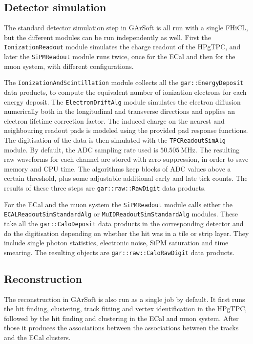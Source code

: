 \subsection{Detector simulation}

The standard detector simulation step in GArSoft is all run with a single FHiCL, but the different modules can be run independently as well. First the \texttt{IonizationReadout} module simulates the charge readout of the HPgTPC, and later the \texttt{SiPMReadout} module runs twice, once for the ECal and then for the muon system, with different configurations.

The \texttt{IonizationAndScintillation} module collects all the \texttt{gar::EnergyDeposit} data products, to compute the equivalent number of ionization electrons for each energy deposit. The \texttt{ElectronDriftAlg} module simulates the electron diffusion numerically both in the longitudinal and transverse directions and applies an electron lifetime correction factor. The induced charge on the nearest and neighbouring readout pads is modeled using the provided pad response functions. The digitisation of the data is then simulated with the \texttt{TPCReadoutSimAlg} module. By default, the ADC sampling rate used is $50.505~\mathrm{MHz}$. The resulting raw waveforms for each channel are stored with zero-suppression, in order to save memory and CPU time. The algorithms keep blocks of ADC values above a certain threshold, plus some adjustable additional early and late tick counts. The results of these three steps are \texttt{gar::raw::RawDigit} data products.

For the ECal and the muon system the \texttt{SiPMReadout} module calls either the \texttt{ECALReadoutSimStandardAlg} or \texttt{MuIDReadoutSimStandardAlg} modules. These take all the \texttt{gar::CaloDeposit} data products in the corresponding detector and do the digitisation depending on whether the hit was in a tile or strip layer. They include single photon statistics, electronic noise, SiPM saturation and time smearing. The resulting objects are \texttt{gar::raw::CaloRawDigit} data products.

\subsection{Reconstruction}

The reconstruction in GArSoft is also run as a single job by default. It first runs the hit finding, clustering, track fitting and vertex identification in the HPgTPC, followed by the hit finding and clustering in the ECal and muon system. After those it produces the associations between the associations between the tracks and the ECal clusters.

